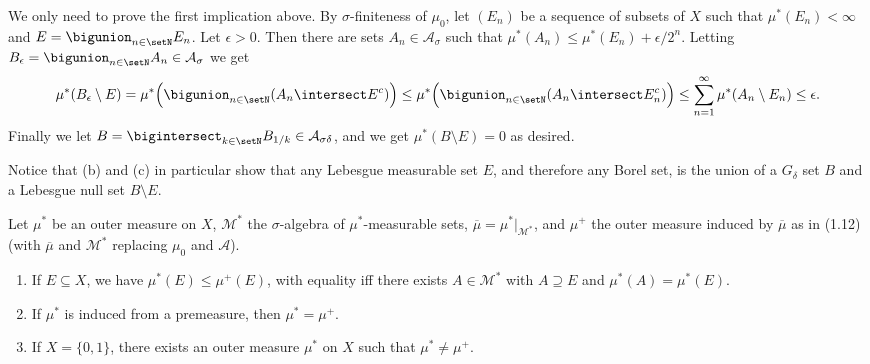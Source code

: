 \documentclass[article, a4paper, 11pt, oneside]{memoir}
\numberwithin{equation}{chapter}
\newcommand{\calM}{\mathcal{M}}
\newcommand{\calA}{\mathcal{A}}
\begin{document}
\begin{solution}
	\item We only need to prove the first implication above. By $\sigma$-finiteness of $\mu_0$, let $(E_n)$ be a sequence of subsets of $X$ such that $\mu^*(E_n) < \infty$ and $E = \bigunion_{n \in \setN} E_n$. Let $\epsilon > 0$. Then there are sets $A_n \in \calA_\sigma$ such that $\mu^*(A_n) \leq \mu^*(E_n) + \epsilon/2^n$. Letting $B_\epsilon = \bigunion_{n \in \setN} A_n \in \calA_\sigma$ we get
	\begin{equation*}
		\mu^*(B_\epsilon \setminus E)
			= \mu^* \Bigl( \bigunion_{n \in \setN} (A_n \intersect E^c) \Bigr)
			\leq \mu^* \Bigl( \bigunion_{n \in \setN} (A_n \intersect E_n^c) \Bigr)
			\leq \sum_{n=1}^\infty \mu^*(A_n \setminus E_n)
			\leq \epsilon.
	\end{equation*}
	Finally we let $B = \bigintersect_{k \in \setN} B_{1/k} \in \calA_{\sigma\delta}$, and we get $\mu^*(B \setminus E) = 0$ as desired.
\end{solution}

\begin{remark*}
    Notice that (b) and (c) in particular show that any Lebesgue measurable set $E$, and therefore any Borel set, is the union of a $G_\delta$ set $B$ and a Lebesgue null set $B \setminus E$.
\end{remark*}


\begin{exerciseframed*}[20]
    Let $\mu^*$ be an outer measure on $X$, $\calM^*$ the $\sigma$-algebra of $\mu^*$-measurable sets, $\overline\mu = \mu^*|_{\calM^*}$, and $\mu^+$ the outer measure induced by $\overline\mu$ as in (1.12) (with $\overline\mu$ and $\calM^*$ replacing $\mu_0$ and $\calA$).
    \begin{enumerate}
        \item If $E \subseteq X$, we have $\mu^*(E) \leq \mu^+(E)$, with equality iff there exists $A \in \calM^*$ with $A \supseteq E$ and $\mu^*(A) = \mu^*(E)$.

        \item If $\mu^*$ is induced from a premeasure, then $\mu^* = \mu^+$.

        \item If $X = \{0,1\}$, there exists an outer measure $\mu^*$ on $X$ such that $\mu^* \neq \mu^+$.
    \end{enumerate}
\end{exerciseframed*}
\end{document}
